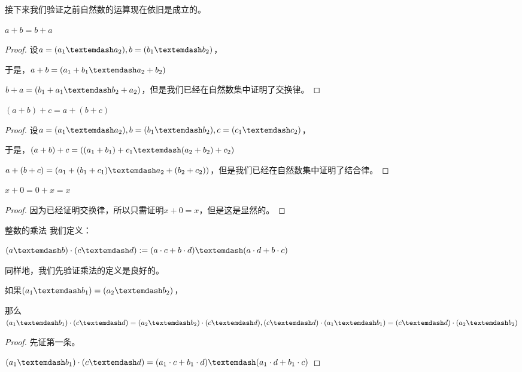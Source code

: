 \documentclass[12pt, a4paper, oneside, UTF8]{ctexbook}
\begin{document}
\begin{para}{0}
					接下来我们验证之前自然数的运算现在依旧是成立的。
					\begin{proposition}
						$a+b=b+a$
					\end{proposition}
					\begin{proof}
						设$a = (a_1 \textemdash a_2),b=(b_1 \textemdash b_2)$，
						
						于是，$a+b = (a_1+b_1 \textemdash a_2+b_2)$
						
						$b+a = (b_1+a_1 \textemdash b_2+a_2)$，但是我们已经在自然数集中证明了交换律。
					\end{proof}
					\begin{proposition}
						$(a+b)+c=a+(b+c)$
					\end{proposition}
					\begin{proof}
						设$a = (a_1 \textemdash a_2),b=(b_1 \textemdash b_2),c=(c_1 \textemdash c_2)$，
						
						于是，$(a+b)+c = \left((a_1+b_1)+c_1 \textemdash (a_2+b_2)+c_2\right)$
						
						$a+(b+c) = \left(a_1+(b_1+c_1) \textemdash a_2+(b_2+c_2)\right)$，但是我们已经在自然数集中证明了结合律。
					\end{proof}
					\begin{proposition}
						$x+0=0+x=x$
					\end{proposition}
					\begin{proof}
						因为已经证明交换律，所以只需证明$x+0=x$，但是这是显然的。
					\end{proof}
					\begin{defn}{整数的乘法}{}
						我们定义：
						
						$(a\textemdash b)\cdot(c\textemdash d) := (a\cdot c + b\cdot d)\textemdash(a\cdot d+b\cdot c)$
					\end{defn}
					同样地，我们先验证乘法的定义是良好的。
					\begin{proposition}
						如果$(a_1 \textemdash b_1)=(a_2 \textemdash b_2)$，
						
						那么$(a_1 \textemdash b_1)\cdot (c\textemdash d)=(a_2 \textemdash b_2)\cdot (c\textemdash d),(c\textemdash d)\cdot (a_1 \textemdash b_1)=(c\textemdash d)\cdot(a_2 \textemdash b_2)$
					\end{proposition}
					\begin{proof}
						先证第一条。
						
						$(a_1 \textemdash b_1)\cdot (c\textemdash d)=(a_1 \cdot c+b_1\cdot d)\textemdash (a_1\cdot d+b_1\cdot c)$
						

\end{proof}
\end{para}
\end{document}
